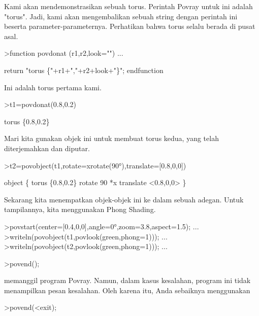 \documentclass{article}
\begin{document}
\begin{eulernotebook}
\begin{eulercomment}
Kami akan mendemonstrasikan sebuah torus. Perintah Povray untuk ini
adalah "torus". Jadi, kami akan mengembalikan sebuah string dengan
perintah ini beserta parameter-parameternya. Perhatikan bahwa torus
selalu berada di pusat asal.
\end{eulercomment}
\begin{eulerprompt}
>function povdonat (r1,r2,look="") ...
\end{eulerprompt}
\begin{eulerudf}
    return "torus \{"+r1+","+r2+look+"\}";
  endfunction
\end{eulerudf}
\begin{eulercomment}
Ini adalah torus pertama kami.
\end{eulercomment}
\begin{eulerprompt}
>t1=povdonat(0.8,0.2)
\end{eulerprompt}
\begin{euleroutput}
  torus \{0.8,0.2\}
\end{euleroutput}
\begin{eulercomment}
Mari kita gunakan objek ini untuk membuat torus kedua, yang telah
diterjemahkan dan diputar.
\end{eulercomment}
\begin{eulerprompt}
>t2=povobject(t1,rotate=xrotate(90°),translate=[0.8,0,0])
\end{eulerprompt}
\begin{euleroutput}
  object \{ torus \{0.8,0.2\}
   rotate 90 *x 
   translate <0.8,0,0>
   \}
\end{euleroutput}
\begin{eulercomment}
Sekarang kita menempatkan objek-objek ini ke dalam sebuah adegan.
Untuk tampilannya, kita menggunakan Phong Shading.
\end{eulercomment}
\begin{eulerprompt}
>povstart(center=[0.4,0,0],angle=0°,zoom=3.8,aspect=1.5); ...
>writeln(povobject(t1,povlook(green,phong=1))); ...
>writeln(povobject(t2,povlook(green,phong=1))); ...
\end{eulerprompt}
\begin{eulerttcomment}
 >povend();
\end{eulerttcomment}
\begin{eulercomment}
memanggil program Povray. Namun, dalam kasus kesalahan, program ini
tidak menampilkan pesan kesalahan. Oleh karena itu, Anda sebaiknya
menggunakan

\end{eulercomment}
\begin{eulerttcomment}
 >povend(<exit);
\end{eulerttcomment}
\begin{eulercomment}


\end{eulercomment}
\end{eulernotebook}
\end{document}
